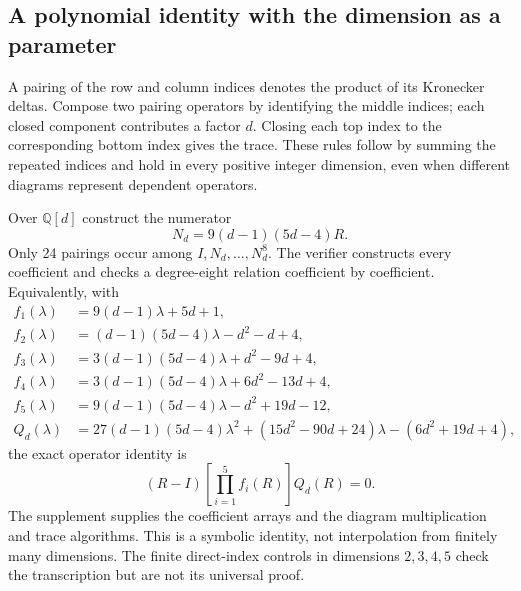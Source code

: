 \documentclass[11pt,a4paper]{article}
\begin{document}
\subsection{A polynomial identity with the dimension as a parameter}
A pairing of the row and column indices denotes the product of its Kronecker deltas. Compose two pairing operators by identifying the middle indices; each closed component contributes a factor $d$. Closing each top index to the corresponding bottom index gives the trace. These rules follow by summing the repeated indices and hold in every positive integer dimension, even when different diagrams represent dependent operators.

Over $\mathbb Q[d]$ construct the numerator
\[
 N_d=9(d-1)(5d-4)R.
\]
Only 24 pairings occur among $I,N_d,\ldots,N_d^8$. The verifier constructs every coefficient and checks a degree-eight relation coefficient by coefficient. Equivalently, with
\begin{align*}
 f_1(\lambda)&=9(d-1)\lambda+5d+1,\\
 f_2(\lambda)&=(d-1)(5d-4)\lambda-d^2-d+4,\\
 f_3(\lambda)&=3(d-1)(5d-4)\lambda+d^2-9d+4,\\
 f_4(\lambda)&=3(d-1)(5d-4)\lambda+6d^2-13d+4,\\
 f_5(\lambda)&=9(d-1)(5d-4)\lambda-d^2+19d-12,\\
 Q_d(\lambda)&=27(d-1)(5d-4)\lambda^2
 +(15d^2-90d+24)\lambda-(6d^2+19d+4),
\end{align*}
the exact operator identity is
\begin{equation}\label{eq:annihilator}
 (R-I)\left[\prod_{i=1}^5 f_i(R)\right]Q_d(R)=0.
\end{equation}
The supplement supplies the coefficient arrays and the diagram multiplication and trace algorithms. This is a symbolic identity, not interpolation from finitely many dimensions. The finite direct-index controls in dimensions $2,3,4,5$ check the transcription but are not its universal proof.
\end{document}
